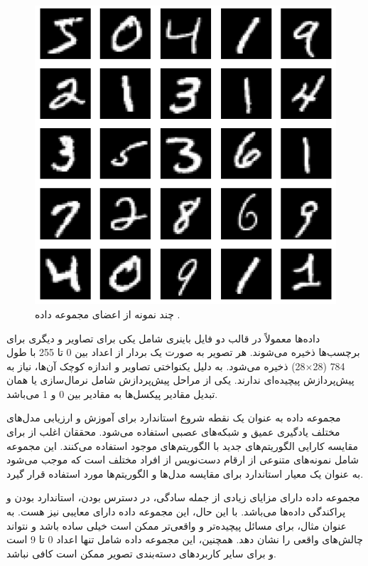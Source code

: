 \begin{figure}[t]
	\centering
	\includegraphics[scale=0.6]{images/chap5/mnist.png}%
	\caption{%
		چند نمونه از اعضای مجموعه داده
		\cite{holzer2023dynamically}.
	}
	\label{mnist}
	\centering
\end{figure}


داده‌ها معمولاً در قالب دو فایل باینری شامل یکی برای تصاویر و دیگری برای برچسب‌ها ذخیره می‌شوند. هر تصویر به صورت یک بردار از اعداد بین 0 تا 255 با طول 784
(28$\times$28)
ذخیره می‌شود. به دلیل یکنواختی تصاویر و اندازه کوچک آن‌ها، نیاز به پیش‌پردازش پیچیده‌ای ندارند. یکی از مراحل پیش‌پردازش شامل نرمال‌سازی یا همان تبدیل مقادیر پیکسل‌ها به مقادیر بین 0 و 1 می‌باشد.

مجموعه داده
به عنوان یک نقطه شروع استاندارد برای آموزش و ارزیابی مدل‌های مختلف یادگیری عمیق و شبکه‌های عصبی استفاده می‌شود. محققان اغلب از
برای مقایسه کارایی الگوریتم‌های جدید با الگوریتم‌های موجود استفاده می‌کنند. این مجموعه شامل نمونه‌های متنوعی از ارقام دست‌نویس از افراد مختلف است که موجب می‌شود به عنوان یک معیار استاندارد برای مقایسه مدل‌ها و الگوریتم‌ها مورد استفاده قرار گیرد.

مجموعه داده
دارای مزایای زیادی از جمله سادگی، در دسترس بودن، استاندارد بودن و پراکندگی داده‌ها می‌باشد. با این حال، این مجموعه داده دارای معایبی نیز هست. به عنوان مثال، برای مسائل پیچیده‌تر و واقعی‌تر ممکن است
خیلی ساده باشد و نتواند چالش‌های واقعی را نشان دهد. همچنین، این مجموعه داده شامل تنها اعداد 0 تا 9 است و برای سایر کاربردهای دسته‌بندی تصویر ممکن است کافی نباشد.

